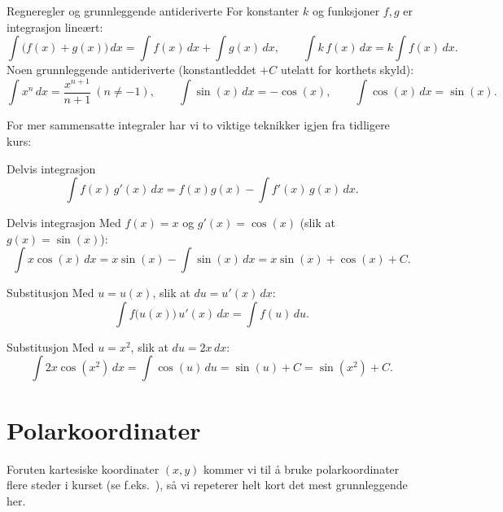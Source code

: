 \begin{oppsum}{Regneregler og grunnleggende antideriverte}
For konstanter $k$ og funksjoner $f,g$ er integrasjon lineært:
\[
\int \bigl(f(x)+g(x)\bigr)\,dx = \int f(x)\,dx + \int g(x)\,dx, \qquad \int k\,f(x)\,dx = k\int f(x)\,dx.
\]
Noen grunnleggende antideriverte (konstantleddet $+C$ utelatt for korthets skyld):
\[
\int x^n\,dx = \frac{x^{n+1}}{n+1}\ (n\neq -1), \qquad \int \sin(x)\,dx = -\cos(x), \qquad \int \cos(x)\,dx = \sin(x).
\]
\end{oppsum}

For mer sammensatte integraler har vi to viktige teknikker igjen fra tidligere kurs:

\begin{defn}{Delvis integrasjon}
\[
\int f(x)\,g'(x)\,dx = f(x)g(x) - \int f'(x)\,g(x)\,dx.
\]
\end{defn}

\begin{eks}{Delvis integrasjon}
Med $f(x)=x$ og $g'(x)=\cos(x)$ (slik at $g(x)=\sin(x)$):
\[
\int x\cos(x)\,dx = x\sin(x) - \int \sin(x)\,dx = x\sin(x)+\cos(x)+C.
\]
\end{eks}

\begin{defn}{Substitusjon}
Med $u=u(x)$, slik at $du = u'(x)\,dx$:
\[
\int f\bigl(u(x)\bigr)\,u'(x)\,dx = \int f(u)\,du.
\]
\end{defn}

\begin{eks}{Substitusjon}
Med $u=x^2$, slik at $du=2x\,dx$:
\[
\int 2x\cos(x^2)\,dx = \int \cos(u)\,du = \sin(u)+C = \sin(x^2)+C.
\]
\end{eks}

\section{Polarkoordinater}
\label{sec:polarkoord-rep}
Foruten kartesiske koordinater $(x,y)$ kommer vi til å bruke polarkoordinater flere steder i kurset (se f.eks.\ ), så vi repeterer helt kort det mest grunnleggende her.

